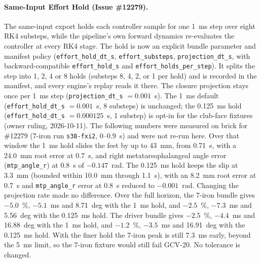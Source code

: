 \documentclass[11pt,a4paper]{article}
\begin{document}
\paragraph{Same-Input Effort Hold (Issue \#12279).}
The same-input export holds each controller sample for one 1~ms step over eight
RK4 substeps, while the pipeline's own forward dynamics re-evaluates the controller
at every RK4 stage. The hold is now an explicit bundle parameter and manifest policy
(\texttt{effort\_hold\_dt\_s}, \texttt{effort\_substeps}, \texttt{projection\_dt\_s},
with backward-compatible \texttt{effort\_hold\_s} and \texttt{effort\_holds\_per\_step}).
It splits the step into 1, 2, 4 or 8 holds (substeps 8, 4, 2, or 1 per hold) and is
recorded in the manifest, and every engine's replay reads it there. The
closure projection stays once per 1~ms step (\texttt{projection\_dt\_s} $= 0.001$~s).
The 1~ms default (\texttt{effort\_hold\_dt\_s} $= 0.001$~s, 8 substeps) is unchanged;
the 0.125~ms hold (\texttt{effort\_hold\_dt\_s} $= 0.000125$~s, 1 substep) is opt-in for
the club-face fixtures (owner ruling, 2026-10-11).
The following numbers were measured on brick for \#12279 (7-iron run
\texttt{s38-fxi2}, 0--0.9~s) and were not re-run here. Over that window the
1~ms hold slides the feet by up to 43~mm, from 0.71~s, with a 24.0~mm root error
at 0.7~s, and right metatarsophalangeal angle error (\texttt{mtp\_angle\_r}) at
0.8~s of $-0.147$~rad. The 0.125~ms hold keeps the slip at 3.3~mm (bounded within
10.0~mm through 1.1~s), with an 8.2~mm root error at 0.7~s and \texttt{mtp\_angle\_r}
error at 0.8~s reduced to $-0.001$~rad.
Changing the projection rate made no difference. Over the full horizon, the
7-iron bundle gives $-5.0$~\%, $-5.1$~ms and 8.71~deg with the 1~ms hold, and
$-2.5$~\%, $-7.3$~ms and 5.56~deg with the 0.125~ms hold. The driver bundle gives
$-2.5$~\%, $-4.4$~ms and 16.88~deg with the 1~ms hold, and $-1.2$~\%, $-3.5$~ms and
16.91~deg with the 0.125~ms hold. With the finer hold the 7-iron peak is still
7.3~ms early, beyond the 5~ms limit, so the 7-iron fixture would still fail
GCV-20. No tolerance is changed.
\end{document}
